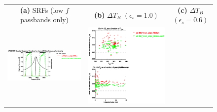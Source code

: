 \begin{figure}[H]
  \centering
  \begin{tabular}{c c c}
    \textsf{\textbf{(a)} SRFs (low $f$ passbands only)} &
    \textsf{\textbf{(b)} $\Delta T_B$ $(\epsilon_s = 1.0)$} &
    \textsf{\textbf{(c)} $\Delta T_B$ $(\epsilon_s = 0.6)$} \\
    \includegraphics[bb=80 400 280 558,clip,scale=0.85]{graphics/srf/Rset/atms_npp.ch14.osrf.eps} &
    \includegraphics[bb=85 400 260 558,clip,scale=0.85]{graphics/dtb/Rset/e1.0_r0.0/atms_npp.ch14.dTb.eps} & 

\end{tabular}
\end{figure}
